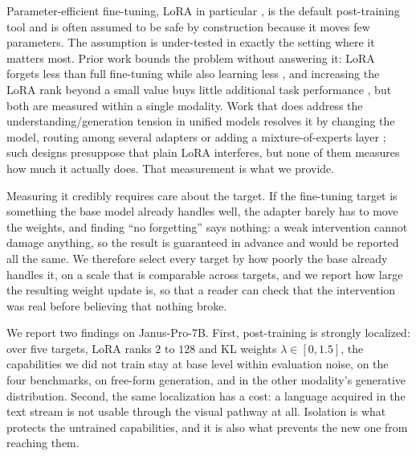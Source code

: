 \documentclass{article}
\begin{document}
Parameter-efficient fine-tuning, LoRA in particular \citep{hu2022lora}, is the
default post-training tool and is often assumed to be safe by construction
because it moves few parameters. The assumption is under-tested in exactly the
setting where it matters most. Prior work bounds the problem without answering
it: LoRA forgets less than full fine-tuning while also learning less
\citep{biderman2024lora}, and increasing the LoRA rank beyond a small value buys
little additional task performance \citep{zhang2024scalingmeetsfinetuning}, but
both are measured within a single modality. Work that does address the
understanding/generation tension in unified models resolves it by changing the
model, routing among several adapters or adding a mixture-of-experts layer
\citep{dou2024loramoe}; such designs presuppose that plain LoRA interferes, but
none of them measures how much it actually does. That measurement is what we
provide.

Measuring it credibly requires care about the target. If the fine-tuning target
is something the base model already handles well, the adapter barely has to move
the weights, and finding ``no forgetting'' says nothing: a weak intervention
cannot damage anything, so the result is guaranteed in advance and would be
reported all the same. We therefore select every target by how poorly the base
already handles it, on a scale that is comparable across targets, and we report
how large the resulting weight update is, so that a reader can check that the
intervention was real before believing that nothing broke.

We report two findings on Janus-Pro-7B. First, post-training is strongly
localized: over five targets, LoRA ranks $2$ to $128$ and KL weights
$\lambda\in[0,1.5]$, the capabilities we did not train stay at base level within
evaluation noise, on the four benchmarks, on free-form generation, and in the
other modality's generative distribution. Second, the same localization has a
cost: a language acquired in the text stream is not usable through the visual
pathway at all. Isolation is what protects the untrained capabilities, and it is
also what prevents the new one from reaching them.
\end{document}
